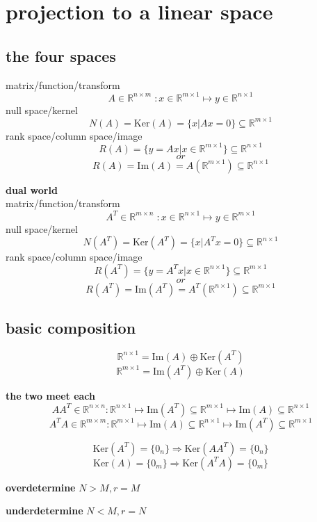 \documentclass[12pt,a4paper]{article}
\author{surecalois}
\begin{document}
\section{projection to a linear space}
\subsection{the four spaces}
matrix/function/transform
\[
A \in \mathbb{R}^{n\times m}\; : x \in  \mathbb{R}^{m \times 1} \mapsto y \in  \mathbb{R}^{n \times 1}
\]
null space/kernel
\[
N(A) = \mathrm{Ker}(A)= \{x|Ax = 0\} \subseteq \mathbb{R}^{m \times 1}
\]
rank space/column space/image
\[
R(A) = \{y = Ax| x \in  \mathbb{R}^{m \times 1}\} \subseteq  \mathbb{R}^{n \times 1} 
\]
\[or\]
\[ R(A) = \mathrm{Im}(A) =  A( \mathbb{R}^{m \times 1} ) \subseteq  \mathbb{R}^{n \times 1}
\]

\textbf{dual world}\\
matrix/function/transform
\[
A^T \in \mathbb{R}^{m\times n}\; : x \in  \mathbb{R}^{n \times 1} \mapsto y \in  \mathbb{R}^{m \times 1}
\]
null space/kernel
\[
N(A^T) = \mathrm{Ker}(A^T) = \{x|A^Tx = 0\} \subseteq \mathbb{R}^{n \times 1}
\]
rank space/column space/image
\[
R(A^T) = \{y = A^Tx| x \in  \mathbb{R}^{n \times 1}\} \subseteq  \mathbb{R}^{m \times 1} 
\]
\[or\]
\[R(A^T) = \mathrm{Im}(A^T) =  A^T( \mathbb{R}^{n \times 1} ) \subseteq  \mathbb{R}^{m \times 1}
\]

\subsection{basic composition}
\[
\mathbb{R}^{n \times 1} = \mathrm{Im}(A)\oplus\mathrm{Ker}(A^T)
\]
\[
\mathbb{R}^{m \times 1} = \mathrm{Im}(A^T)\oplus\mathrm{Ker}(A)
\]


\textbf{the two meet each}
\[
AA^T \in \mathbb{R}^{n \times n} : \mathbb{R}^{n\times 1} \mapsto \mathrm{Im}(A^T) \subseteq \mathbb{R}^{m \times 1} \mapsto \mathrm{Im}(A) \subseteq \mathbb{R}^{n \times 1}
\]
\[
A^TA \in \mathbb{R}^{m \times m}: \mathbb{R}^{m\times 1} \mapsto \mathrm{Im}(A) \subseteq \mathbb{R}^{n \times 1} \mapsto \mathrm{Im}(A^T) \subseteq \mathbb{R}^{m \times 1}
\]

\[
\mathrm{Ker}(A^T) = \{0_n\} \Rightarrow \mathrm{Ker}(AA^T) = \{0_n\}
\]
\[
\mathrm{Ker}(A) = \{0_m\} \Rightarrow \mathrm{Ker}(A^TA) = \{0_m\}
\]

\textbf{overdetermine}
$N > M , r = M$ 

\textbf{underdetermine}
$N < M , r = N$
\end{document}
